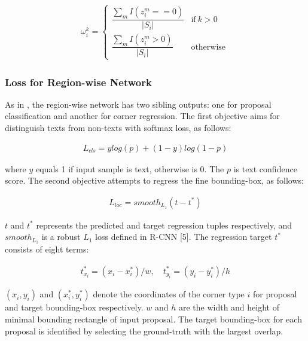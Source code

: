 \documentclass[3p, times]{elsarticle}
\begin{document}
\begin{align}
\omega_i^k = \left\{
             \begin{array}{ll}
             {\dfrac{\sum_{m}{I(z_i^m==0)}}{|S_i|}} & \text{if}\ k>0 \, \\
             {\dfrac{\sum_{m}{I(z_i^m>0)}}{|S_i|}} & \text{otherwise} \,
             \end{array}
           \right.
\label{Eq:Loss_Seg_Weight}
\end{align}



\subsubsection{Loss for Region-wise Network}
As in \cite{FASTRCNN2015ICCV}, the region-wise network has two sibling outputs: one for proposal classification and another for corner regression. The first objective aims for distinguish texts from non-texts with softmax loss, as follows:

\begin{gather}
L_{cls}=ylog(p)+(1-y)log(1-p)
\label{Eq:Loss_Cls}
\end{gather}

\noindent where $y$ equals 1 if input sample is text, otherwise is 0. The $p$ is text confidence score. The second objective attempts to regress the fine bounding-box, as follows:

\begin{gather}
L_{loc}=smooth_{L_1}(t-t^{*})
\label{Eq:Loss_Loc}
\end{gather}

\noindent $t$ and $t^{*}$ represents the predicted and target regression tuples respectively, and $smooth_{L_1}$ is a robust $L_1$ loss defined in R-CNN [5]. The regression target $t^{*}$ consists of eight terms:

\begin{gather}
t_{x_i}^{*}=(x_i-x_i^*)/w,\quad t_{y_i}^{*}=(y_i-y_i^*)/h
\label{Eq:Reg_Target}
\end{gather}

\noindent $(x_i,y_i)$ and $(x_i^*,y_i^*)$ denote the coordinates of the corner type $i$ for proposal and target bounding-box respectively. $w$ and $h$ are the width and height of minimal bounding rectangle of input proposal. The target bounding-box for each proposal is identified by selecting the ground-truth with the largest overlap.
\end{document}
